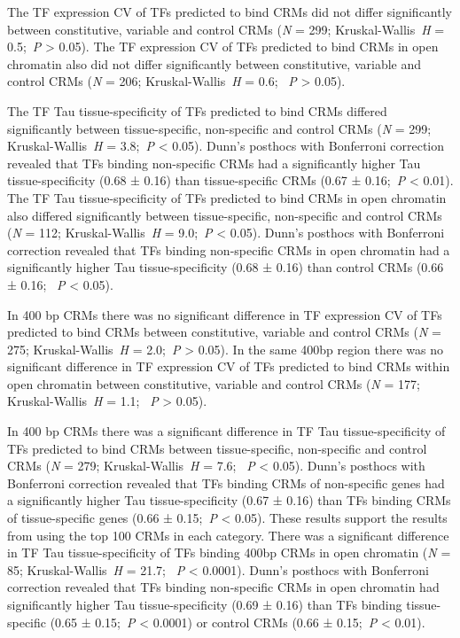 \documentclass[../main.tex]{subfiles}
\begin{document}
The TF expression CV of TFs predicted to bind CRMs did not differ significantly between constitutive, variable and control CRMs (\textit{N} = 299; Kruskal\hyp{}Wallis~\textit{H} = 0.5;~\textit{P} \textgreater{} 0.05).
The TF expression CV of TFs predicted to bind CRMs in open chromatin also did not differ significantly between constitutive, variable and control CRMs (\textit{N} = 206; Kruskal\hyp{}Wallis~\textit{H} = 0.6; ~\textit{P} \textgreater{} 0.05).

The TF Tau tissue\hyp{}specificity of TFs predicted to bind CRMs differed significantly between tissue\hyp{}specific, non\hyp{}specific and control CRMs (\textit{N} = 299; Kruskal\hyp{}Wallis~\textit{H} = 3.8;~\textit{P} \textless{} 0.05).
Dunn's posthocs with Bonferroni correction revealed that TFs binding non\hyp{}specific CRMs had a significantly higher Tau tissue\hyp{}specificity (0.68 ± 0.16) than tissue\hyp{}specific CRMs (0.67 ± 0.16;~\textit{P} \textless{} 0.01).
The TF Tau tissue\hyp{}specificity of TFs predicted to bind CRMs in open chromatin also differed significantly between tissue\hyp{}specific, non\hyp{}specific and control CRMs (\textit{N} = 112; Kruskal\hyp{}Wallis~\textit{H} = 9.0;~\textit{P} \textless{} 0.05).
Dunn's posthocs with Bonferroni correction revealed that TFs binding non\hyp{}specific CRMs in open chromatin had a significantly higher Tau tissue\hyp{}specificity (0.68 ± 0.16) than control CRMs (0.66 ± 0.16; ~\textit{P} \textless{} 0.05).

In 400 bp CRMs there was no significant difference in TF expression CV of TFs predicted to bind CRMs between constitutive, variable and control CRMs (\textit{N} = 275; Kruskal\hyp{}Wallis~\textit{H} = 2.0;~\textit{P} \textgreater{} 0.05).
In the same 400bp region there was no significant difference in TF expression CV of TFs predicted to bind CRMs within open chromatin between constitutive, variable and control CRMs (\textit{N} = 177; Kruskal\hyp{}Wallis~\textit{H} = 1.1; ~\textit{P} \textgreater{} 0.05).



In 400 bp CRMs there was a significant difference in TF Tau tissue\hyp{}specificity of TFs predicted to bind CRMs between tissue\hyp{}specific, non\hyp{}specific and control CRMs (\textit{N} = 279; Kruskal\hyp{}Wallis~\textit{H} = 7.6; ~\textit{P} \textless{} 0.05).
Dunn's posthocs with Bonferroni correction revealed that TFs binding CRMs of non\hyp{}specific genes had a significantly higher Tau tissue\hyp{}specificity (0.67 ± 0.16) than TFs binding CRMs of tissue\hyp{}specific genes (0.66 ± 0.15;~\textit{P} \textless{} 0.05).
These results support the results from using the top 100 CRMs in each category.
There was a significant difference in TF Tau tissue\hyp{}specificity of TFs binding 400bp CRMs in open chromatin (\textit{N} = 85; Kruskal\hyp{}Wallis~\textit{H} = 21.7; ~\textit{P} \textless{} 0.0001).
Dunn's posthocs with Bonferroni correction revealed that TFs binding non\hyp{}specific CRMs in open chromatin had significantly higher Tau tissue\hyp{}specificity (0.69 ± 0.16) than TFs binding tissue\hyp{}specific (0.65 ± 0.15;~\textit{P} \textless{} 0.0001) or control CRMs (0.66 ± 0.15;~\textit{P} \textless{} 0.01).
\end{document}
